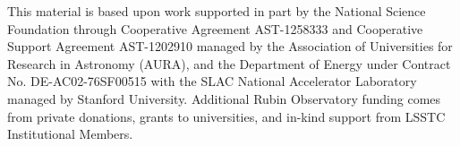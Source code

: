 \documentclass[twocolumn]{aastex631}
\begin{document}

\date{\today}






\begin{acknowledgments}
This material is based upon work supported in part by the National Science Foundation through Cooperative Agreement AST-1258333 and Cooperative Support Agreement AST-1202910 managed by the Association of Universities for Research in Astronomy (AURA), and the Department of Energy under Contract No. DE-AC02-76SF00515 with the SLAC National Accelerator Laboratory managed by Stanford University.
Additional Rubin Observatory funding comes from private donations, grants to universities, and in-kind support from LSSTC Institutional Members.
\end{acknowledgments}


\label{sec:bib}

\end{document}
